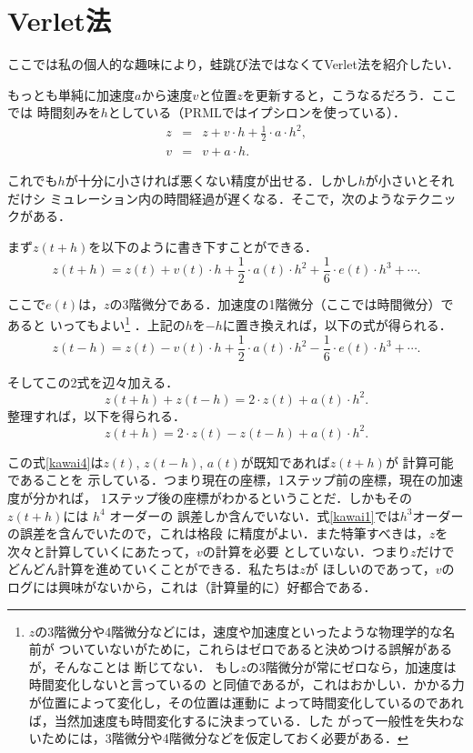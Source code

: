 \section{Verlet法}

  ここでは私の個人的な趣味により，蛙跳び法ではなくてVerlet法を紹介したい．

  もっとも単純に加速度$a$から速度$v$と位置$z$を更新すると，こうなるだろう．ここでは
時間刻みを$h$としている（PRMLではイプシロンを使っている）．
\begin{eqnarray}
\label{kawai1}z &=& z + v \cdot h + \frac{1}{2} \cdot a \cdot h^2,\\
\label{kawai2}v &=& v + a \cdot h.
\end{eqnarray}

  これでも$h$が十分に小さければ悪くない精度が出せる．しかし$h$が小さいとそれだけシ
ミュレーション内の時間経過が遅くなる．そこで，次のようなテクニックがある．

  まず$z(t+h)$を以下のように書き下すことができる．
%
    $$z(t+h) = z(t) + v(t)\cdot h + \frac{1}{2} \cdot a(t) \cdot h^2 + \frac{1}{6} \cdot e(t) \cdot h^3 + \cdots.$$

ここで$e(t)$は，$z$の3階微分である．加速度の1階微分（ここでは時間微分）であると
いってもよい\footnote{%
$z$の3階微分や4階微分などには，速度や加速度といったような物理学的な名前が
ついていないがために，これらはゼロであると決めつける誤解があるが，そんなことは
断じてない．
もし$z$の3階微分が常にゼロなら，加速度は時間変化しないと言っているの
と同値であるが，これはおかしい．かかる力が位置によって変化し，その位置は運動に
よって時間変化しているのであれば，当然加速度も時間変化するに決まっている．した
がって一般性を失わないためには，3階微分や4階微分などを仮定しておく必要がある．
}%
．上記の$h$を$-h$に置き換えれば，以下の式が得られる．
$$z(t-h) = z(t) - v(t) \cdot h + \frac{1}{2} \cdot a(t) \cdot h^{2} - \frac{1}{6} \cdot e(t) \cdot h^{3} + \cdots.$$

そしてこの2式を辺々加える．
\begin{equation}\label{kawai3}
    z(t+h) + z(t-h) = 2 \cdot z(t) + a(t) \cdot h^2.
\end{equation}
整理すれば，以下を得られる．
\begin{equation}\label{kawai4}
    z(t+h) = 2 \cdot z(t) - z(t-h) + a(t) \cdot h^2.
\end{equation}

  この式\eqref{kawai4}は$z(t)$, $z(t-h)$, $a(t)$が既知であれば$z(t+h)$が
計算可能であることを
示している．つまり現在の座標，1ステップ前の座標，現在の加速度が分かれば，
1ステップ後の座標がわかるということだ．しかもその$z(t+h)$には $h^4$ オーダーの
誤差しか含んでいない．式\eqref{kawai1}では$h^3$オーダーの誤差を含んでいたので，これは格段
に精度がよい．また特筆すべきは，$z$を次々と計算していくにあたって，$v$の計算を必要
としていない．つまり$z$だけでどんどん計算を進めていくことができる．私たちは$z$が
ほしいのであって，$v$のログには興味がないから，これは（計算量的に）好都合である．

